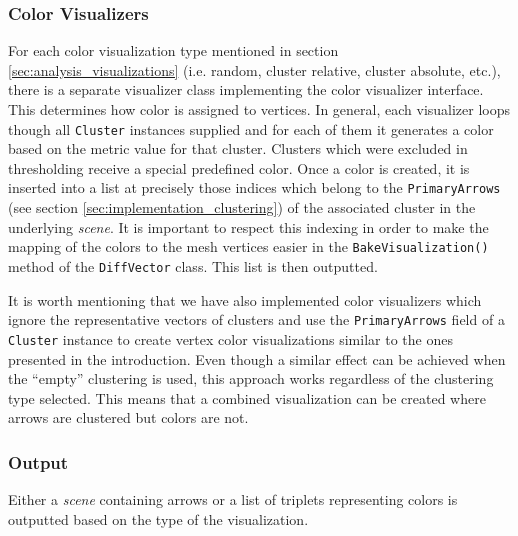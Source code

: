 \subsubsection{Color Visualizers}

For each color visualization type mentioned in section \ref{sec:analysis_visualizations} (i.e. random, cluster relative, cluster absolute, etc.), there is a separate visualizer class implementing the color visualizer interface. This determines how color is assigned to vertices. In general, each visualizer loops though all \verb+Cluster+ instances supplied and for each of them it generates a color based on the metric value for that cluster. Clusters which were excluded in thresholding receive a special predefined color. Once a color is created, it is inserted into a list at precisely those indices which belong to the \verb+PrimaryArrows+ (see section \ref{sec:implementation_clustering}) of the associated cluster in the underlying {\it scene}. It is important to respect this indexing in order to make the mapping of the colors to the mesh vertices easier in the \verb+BakeVisualization()+ method of the \verb+DiffVector+ class. This list is then outputted.

It is worth mentioning that we have also implemented color visualizers which ignore the representative vectors of clusters and use the \verb+PrimaryArrows+ field of a \verb+Cluster+ instance to create vertex color visualizations similar to the ones presented in the introduction. Even though a similar effect can be achieved when the ``empty'' clustering is used, this approach works regardless of the clustering type selected. This means that a combined visualization can be created where arrows are clustered but colors are not\footnotemark.


\subsubsection{Output}

Either a {\it scene} containing arrows or a list of triplets representing colors is outputted based on the type of the visualization.
